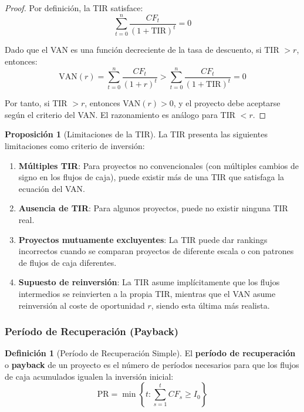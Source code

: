 \documentclass[12pt,a4paper]{article}
\theoremstyle{definition}
\newtheorem{definicion}{Definición}[section]
\newtheorem{proposicion}{Proposición}[section]
\begin{document}
\begin{proof}
Por definición, la TIR satisface:
$$\sum_{t=0}^{n} \frac{CF_t}{(1+\text{TIR})^t} = 0$$

Dado que el VAN es una función decreciente de la tasa de descuento, si TIR $> r$, entonces:
$$\text{VAN}(r) = \sum_{t=0}^{n} \frac{CF_t}{(1+r)^t} > \sum_{t=0}^{n} \frac{CF_t}{(1+\text{TIR})^t} = 0$$

Por tanto, si TIR $> r$, entonces VAN$(r) > 0$, y el proyecto debe aceptarse según el criterio del VAN. El razonamiento es análogo para TIR $< r$.
\end{proof}

\begin{proposicion}[Limitaciones de la TIR]
La TIR presenta las siguientes limitaciones como criterio de inversión:

\begin{enumerate}
\item \textbf{Múltiples TIR}: Para proyectos no convencionales (con múltiples cambios de signo en los flujos de caja), puede existir más de una TIR que satisfaga la ecuación del VAN.

\item \textbf{Ausencia de TIR}: Para algunos proyectos, puede no existir ninguna TIR real.

\item \textbf{Proyectos mutuamente excluyentes}: La TIR puede dar rankings incorrectos cuando se comparan proyectos de diferente escala o con patrones de flujos de caja diferentes.

\item \textbf{Supuesto de reinversión}: La TIR asume implícitamente que los flujos intermedios se reinvierten a la propia TIR, mientras que el VAN asume reinversión al coste de oportunidad $r$, siendo esta última más realista.
\end{enumerate}
\end{proposicion}

\begin{center}
    
\end{center}

\subsubsection{Período de Recuperación (Payback)}

\begin{definicion}[Período de Recuperación Simple]
El \textbf{período de recuperación} o \textbf{payback} de un proyecto es el número de períodos necesarios para que los flujos de caja acumulados igualen la inversión inicial:
\begin{equation}
\text{PR} = \min\left\{t : \sum_{s=1}^{t} CF_s \geq I_0\right\}
\end{equation}
\end{definicion}
\end{document}
